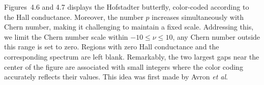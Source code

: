 

Figures~4.6 and 4.7 displays the Hofstadter butterfly, color-coded according to the Hall conductance. Moreover, the number $p$ increases simultaneously with Chern number, making it challenging to maintain a fixed scale. Addressing this, we limit the Chern number scale within $-10 \leq \nu \leq 10$, any Chern number outside this range is set to zero. Regions with zero Hall conductance and the corresponding spectrum are left blank. Remarkably, the two largest gaps near the center of the figure are associated with small integers where the color coding accurately reflects their values. This idea was first made by Avron \textit{et al}\cite{avron2003}. 

